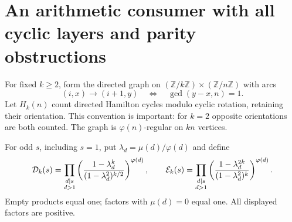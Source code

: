 \section{An arithmetic consumer with all cyclic layers and parity obstructions}
\label{sec:layeredcoprime}
For fixed \(k\geq2\), form the directed graph on
\((\mathbb Z/k\mathbb Z)\times(\mathbb Z/n\mathbb Z)\)
with arcs
\[
 (i,x)\longrightarrow(i+1,y)
             \quad\Longleftrightarrow\quad \gcd(y-x,n)=1 .
\]
Let \(H_k(n)\) count directed Hamilton cycles modulo cyclic
rotation, retaining their orientation. This convention is
important: for \(k=2\) opposite orientations are both counted.
The graph is \(\varphi(n)\)-regular on \(kn\) vertices.

For odd \(s\), including \(s=1\), put
\(\lambda_d=\mu(d)/\varphi(d)\) and define
\[
 {\cal D}_k(s)=
 \prod_{\substack{d\mid s\\d>1}}
 \left(\frac{1-\lambda_d^k}
              {(1-\lambda_d^2)^{k/2}}\right)^{\varphi(d)},
 \qquad
 {\cal E}_k(s)=
 \prod_{\substack{d\mid s\\d>1}}
 \left(\frac{1-\lambda_d^{2k}}
              {(1-\lambda_d^2)^k}\right)^{\varphi(d)} .
\]
Empty products equal one; factors with \(\mu(d)=0\) equal one.
All displayed factors are positive.

